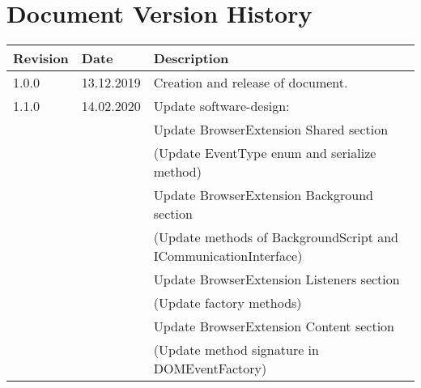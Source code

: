 \chapter*{Document Version History}
\label{ch:versionhistory}
\begin{table}[h]
\begin{tabular}{lll}
\textbf{Revision} & \textbf{Date} & \textbf{Description}              \\
\hline
1.0.0             & 13.12.2019    & Creation and release of document. \\
\hline
1.1.0			  & 14.02.2020	  & Update software-design: \\
&& Update BrowserExtension Shared section\\
&& (Update EventType enum and serialize method)\\
&& Update BrowserExtension Background section\\
&& (Update methods of BackgroundScript and ICommunicationInterface)\\
&& Update BrowserExtension Listeners section\\
&& (Update factory methods)\\
&& Update BrowserExtension Content section\\
&& (Update method signature in DOMEventFactory)\\
\end{tabular}
\end{table}